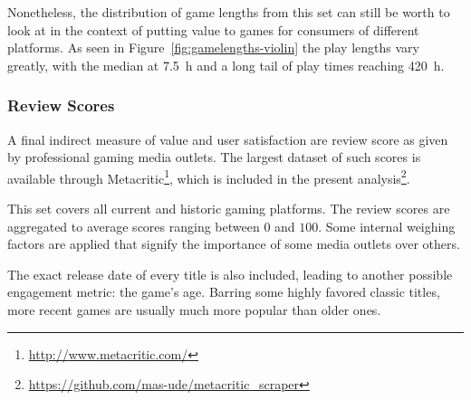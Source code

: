Nonetheless, the distribution of game lengths from this set can still be worth to look at in the context of putting value to games for consumers of different platforms. As seen in Figure~\ref{fig:gamelengths-violin} the play lengths vary greatly, with the median at \SI{7.5}{\hour} and a long tail of play times reaching \SI{420}{\hour}.



\subsubsection{Review Scores}


A final indirect measure of value and user satisfaction are review score as given by professional gaming media outlets. The largest dataset of such scores is available through Metacritic\footnote{\url{http://www.metacritic.com/}}, which is included in the present analysis\footnote{\url{https://github.com/mas-ude/metacritic_scraper}}.

This set covers all current and historic gaming platforms. The review scores are aggregated to average scores ranging between $0$ and $100$. Some internal weighing factors are applied that  signify the importance of some media outlets over others.

The exact release date of every title is also included, leading to another possible engagement metric: the game's age. Barring some highly favored classic titles, more recent games are usually much more popular than older ones.







